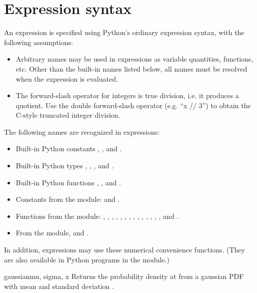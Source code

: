 \section{Expression syntax}

An expression is specified using Python's ordinary expression syntax,
with the following assumptions:
\begin{itemize}
 \item Arbitrary names may be used in expressions as variable
 quantities, functions, etc.  Other than the built-in names listed
 below, all names must be resolved when the expression is evaluated.

 \item The forward-slash operator for integers is true division, i.e. it
 produces a  quotient.  Use the double forward-slash
 operator (e.g. ``x // 3'') to obtain the C-style truncated integer
 division.
\end{itemize}

The following names are recognized in expressions:
\begin{itemize}
 \item Built-in Python constants , , and
 .  

 \item Built-in Python types , , ,
 and .

 \item Built-in Python functions , , and .

 \item Constants from the  module:  and .

 \item Functions from the  module: ,
 , , , , ,
 , , , , ,
 , , , and .

 \item From the  module,  and
 .
\end{itemize}

In addition, expressions may use these numerical convenience functions.
(They are also available in Python programs in the 
module.)

\begin{funcdesc}{gaussian}{mu, sigma, x}
Returns the probability density at  from a gaussian PDF with mean
 and standard deviation .
\end{funcdesc}

